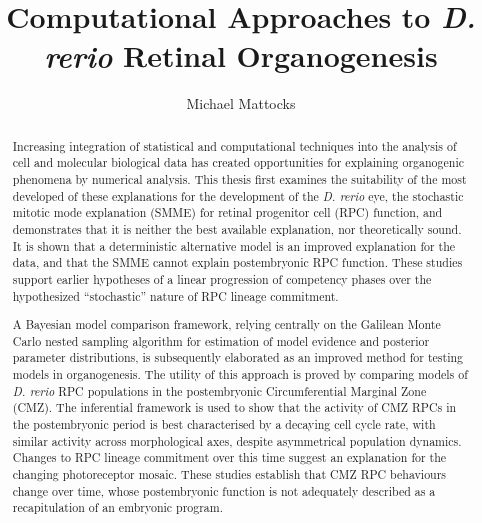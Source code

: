 \documentclass{ut-thesis}
\author{Michael Mattocks}
\title{Computational Approaches to \textit{D. rerio} Retinal Organogenesis}
\begin{document}
\begin{preliminary}

\maketitle


\begin{abstract}
Increasing integration of statistical and computational techniques into the analysis of cell and molecular biological data has created opportunities for explaining organogenic phenomena by numerical analysis. This thesis first examines the suitability of the most developed of these explanations for the development of the \textit{D. rerio} eye, the stochastic mitotic mode explanation (SMME) for retinal progenitor cell (RPC) function, and demonstrates that it is neither the best available explanation, nor theoretically sound. It is shown that a deterministic alternative model is an improved explanation for the data, and that the SMME cannot explain postembryonic RPC function. These studies support earlier hypotheses of a linear progression of competency phases over the hypothesized ``stochastic'' nature of RPC lineage commitment.

A Bayesian model comparison framework, relying centrally on the Galilean Monte Carlo nested sampling algorithm for estimation of model evidence and posterior parameter distributions, is subsequently elaborated as an improved method for testing models in organogenesis. The utility of this approach is proved by comparing models of \textit{D. rerio} RPC populations in the postembryonic Circumferential Marginal Zone (CMZ). The inferential framework is used to show that the activity of CMZ RPCs in the postembryonic period is best characterised by a decaying cell cycle rate, with similar activity across morphological axes, despite asymmetrical population dynamics. Changes to RPC lineage commitment over this time suggest an explanation for the changing photoreceptor mosaic. These studies establish that CMZ RPC behaviours change over time, whose postembryonic function is not adequately described as a recapitulation of an embryonic program.


\end{abstract}
\end{preliminary}
\end{document}
